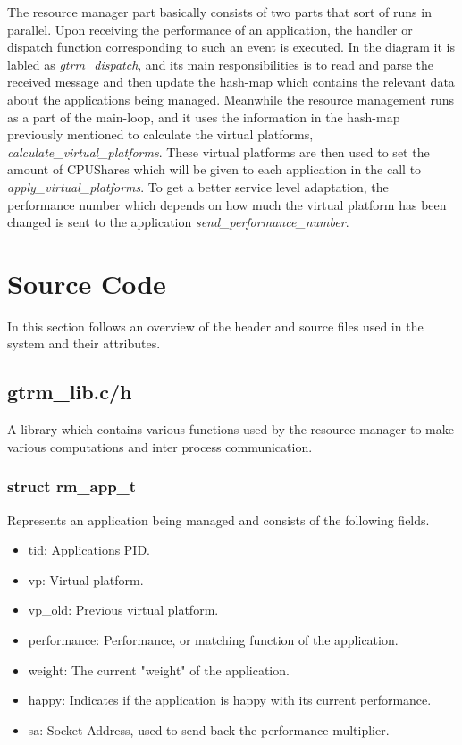 \documentclass[nobiblatex]{LTHthesis}
\begin{document}
The resource manager part basically consists of two parts that sort of runs in parallel. Upon receiving the performance of an application, the handler or dispatch function corresponding to such an event is executed. In the diagram it is labled as \emph{gtrm\_dispatch}, and its main responsibilities is to read and parse the received message and then update the hash-map which contains the relevant data about the applications being managed. Meanwhile the resource management runs as a part of the main-loop, and it uses the information in the hash-map previously mentioned to calculate the virtual platforms, \emph{calculate\_virtual\_platforms}. These virtual platforms are then used to set the amount of CPUShares which will be given to each application in the call to \emph{apply\_virtual\_platforms}. To get a better service level adaptation, the performance number which depends on how much the virtual platform has been changed is sent to the application \emph{send\_performance\_number}.

\section{Source Code}
In this section follows an overview of the header and source files used in the system and their attributes.
\subsection{gtrm\_lib.c/h}
A library which contains various functions used by the resource manager to make various computations and inter process communication.

\subsubsection{struct rm\_app\_t}
Represents an application being managed and consists of the following fields.
\begin{itemize}
\item tid: Applications PID.
\item vp: Virtual platform.
\item vp\_old: Previous virtual platform.
\item performance: Performance, or matching function of the application.
\item weight: The current "weight" of the application.
\item happy: Indicates if the application is happy with its current performance.
\item sa: Socket Address, used to send back the performance multiplier.
\end{itemize}
\end{document}
